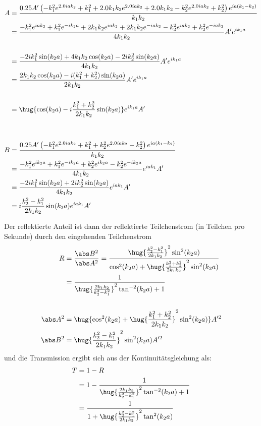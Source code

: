 \documentclass[ex,minted]{exercise_4.0}
\begin{document}
\begin{align*}
    A &= \frac{0.25 A' \left(- k_{1}^{2} e^{2.0 i a k_{2}} + k_{1}^{2} + 2.0 k_{1} k_{2} e^{2.0 i a k_{2}} + 2.0 k_{1} k_{2} - k_{2}^{2} e^{2.0 i a k_{2}} + k_{2}^{2}\right) e^{i a \left(k_{1} - k_{2}\right)}}{k_{1} k_{2}} \\
    &= \frac{- k_{1}^{2} e^{i a k_{2}} + k_{1}^{2} e^{-i k_{2} a} + 2 k_{1} k_{2} e^{i a k_2} + 2 k_{1} k_{2} e^{-i a k_2} - k_{2}^{2} e^{i a k_{2}} + k_2^2 e^{-i a k_2}}{4 k_{1} k_{2}} A' e^{i k_{1} a}\\
    \\
    &= \frac{- 2 i k_1^2 \sin(k_2 a) + 4 k_1 k_2 \cos(k_2 a)  - 2 i k_2^2  \sin(k_2 a)}{4 k_{1} k_{2}} A' e^{i k_{1} a}\\
    &= \frac{2 k_1 k_2 \cos(k_2 a)  - i (k_1^2 + k_2^2)  \sin(k_2 a)}{2 k_{1} k_{2}} A' e^{i k_{1} a}\\
    \\
    &= \hug{\cos(k_2 a)  - i \frac{k_1^2 + k_2^2}{2 k_1 k_2}  \sin(k_2 a)} e^{i k_{1} a} A'\\
    \\
    \\
    B &= \frac{0.25 A' \left(- k_{1}^{2} e^{2.0 i a k_{2}} + k_{1}^{2} + k_{2}^{2} e^{2.0 i a k_{2}} - k_{2}^{2}\right) e^{i a \left(k_{1} - k_{2}\right)}}{k_{1} k_{2}}\\
    &= \frac{- k_1^2 e^{i k_2 a} + k_1^2 e^{-i k_2 a}+ k_2^2 e^{i k_2 a} - k_2^2 e^{-i k_2 a} }{4 k_1 k_2} e^{i a k_1} A'\\
    &= \frac{- 2 i k_1^2 \sin(k_2 a) + 2 i k_2^2 \sin(k_2 a) }{4 k_1 k_2} e^{i a k_1} A'\\
    &= i\frac{k_2^2-k_1^2}{2 k_1 k_2} \sin(k_2 a) e^{i a k_1} A'\\
\end{align*}

Der reflektierte Anteil ist dann der reflektierte Teilchenstrom (in Teilchen pro Sekunde) durch den eingehenden Teilchenstrom
\begin{align*}
    R &= \frac{\abs B^2}{\abs A^2}
    = \frac{\hug{\frac{k_2^2-k_1^2}{2 k_1 k_2}}^2 \sin^2(k_2 a)}{\cos^2(k_2 a)  + \hug{\frac{k_1^2 + k_2^2}{2 k_1 k_2}}^2 \sin^2(k_2 a)}\\
    &= \frac{1}{\hug{\frac{2 k_1 k_2}{k_2^2-k_1^2}}^2 \tan^{-2}(k_2 a) + 1}\\
    \\
    \abs A^2 &= \hug{\cos^2(k_2 a)  + \hug{\frac{k_1^2 + k_2^2}{2 k_1 k_2}}^2 \sin^2(k_2 a)}  A'^2\\
    \abs B^2 &= \hug{\frac{k_2^2-k_1^2}{2 k_1 k_2}}^2 \sin^2(k_2 a)A'^2\\
\end{align*}
und die Transmission ergibt sich aus der Kontinuitätsgleichung als: 
\begin{align*}
   T &= 1- R\\
   &= 1- \frac{1}{\hug{\frac{2 k_1 k_2}{k_2^2-k_1^2}}^2 \tan^{-2}(k_2 a) + 1} \\
   &= \frac{1}{1 + \hug{\frac{k_2^2-k_1^2}{2 k_1 k_2}}^2 \tan^{2}(k_2 a)} \\
\end{align*}
\end{document}
